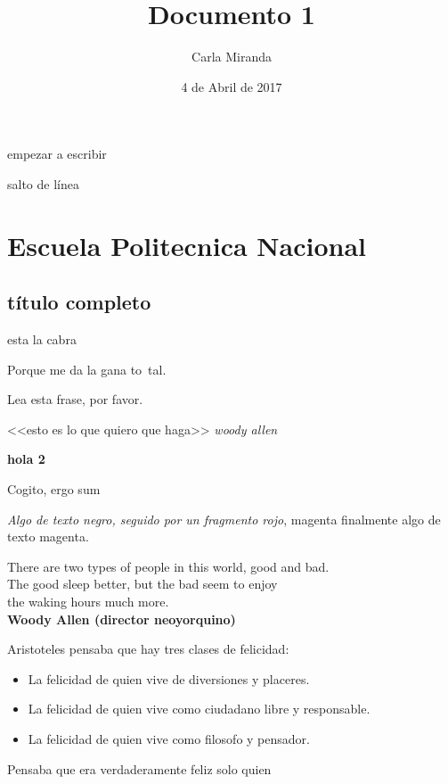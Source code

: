 \documentclass[a4paper,12pt]{article}
\author{Carla Miranda}
\title{Documento 1}
\date{4 de Abril de 2017}
\begin{document}
	\maketitle
	
empezar a escribir
		
salto de línea 
		
\section[EPN]{Escuela Politecnica Nacional}
\subsection[EDO]{título completo}

esta la cabra


Porque me da la gana to\ tal.

\centerline{Lea esta frase, por favor.}

\begin{center}
	<<esto es lo que quiero que haga>>
	\emph{woody allen}
\end{center}

\textbf{hola 2}

{\LARGE Cogito, ergo sum}

\emph{Algo de texto negro, \color{red}
seguido por un fragmento rojo}, {\color
{magenta} finalmente algo de texto magenta.}

\begin{flushright}
There are two types of people in this world, good and bad. \\
The good sleep better, but the bad seem to enjoy \\
the waking hours much more. \\
\textbf{Woody Allen (director neoyorquino)}
\end{flushright}


Aristoteles pensaba que hay tres clases de felicidad:
\begin{itemize}
\item La felicidad de quien vive de diversiones y placeres.
\item La felicidad de quien vive como ciudadano libre y responsable.
\item La felicidad de quien vive como filosofo y pensador.
\end{itemize}
Pensaba que era verdaderamente feliz solo quien
\end{document}
